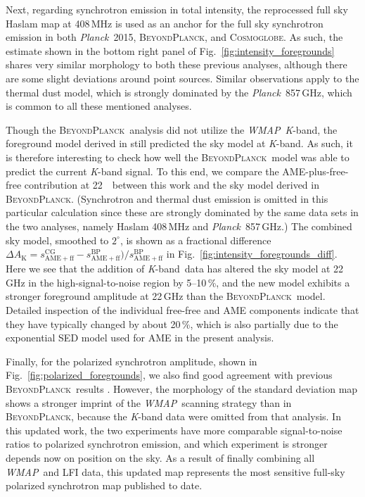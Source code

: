 \documentclass[twocolumn]{../../common/aa}
\def\WMAP{\emph{WMAP}}
\def\Planck{\emph{Planck}}
\newcommand{\BP}{\textsc{BeyondPlanck}}
\newcommand{\bp}{\textsc{BeyondPlanck}}
\newcommand{\cosmoglobe}{\textsc{Cosmoglobe}}
\newcommand{\K}[0]{\textit K}
\begin{document}
Next, regarding synchrotron emission in total intensity, the reprocessed full sky Haslam map \citep{remazeilles2014} at 408\,MHz is used as an anchor for the full sky synchrotron emission in both \Planck\ 2015, \bp, and \cosmoglobe. As such, the estimate shown in the bottom right panel of Fig.~\ref{fig:intensity_foregrounds} shares very similar morphology to both these previous analyses, although there are some slight deviations around point sources. Similar observations apply to the thermal dust model, which is strongly dominated by the \Planck\ 857\,GHz, which is common to all these mentioned analyses. 

Though the \BP\ analysis did not utilize the \WMAP\ \K-band, the foreground model derived in \cite{bp13} still predicted the sky model at \K-band. As such, it is therefore interesting to check how well the \BP\ model was able to predict the current \K-band signal. To this end, we compare the AME-plus-free-free contribution at 22~\GHz\ between this work and the sky model derived in \BP. (Synchrotron and thermal dust emission is omitted in this particular calculation since these are strongly dominated by the same data sets in the two analyses, namely Haslam 408\,MHz and \Planck\ 857\,GHz.) The combined sky model, smoothed to $2^\circ$, is shown as a fractional difference $\Delta A_{\mathrm{K}}=s^{\mathrm{CG}}_{\mathrm{AME}+\mathrm{ff}}-s^{\mathrm{BP}}_{\mathrm{AME}+\mathrm{ff}})/s^{\mathrm{BP}}_{\mathrm{AME}+\mathrm{ff}}$ in Fig.~\ref{fig:intensity_foregrounds_diff}. Here we see that the addition of \K-band\ data has altered the sky model at 22\,GHz in the high-signal-to-noise region by 5--10\,\%, and the new model exhibits a stronger foreground amplitude at 22\,GHz than the \bp\ model. Detailed inspection of the individual free-free and AME components indicate that they have typically changed by about 20\,\%, which is also partially due to the exponential SED model used for AME in the present analysis. 


Finally, for the polarized synchrotron amplitude, shown in Fig.~\ref{fig:polarized_foregrounds}, we also find good agreement with previous \bp\ results \citep{bp14}. However, the morphology of the standard deviation map shows a stronger imprint of the \WMAP\ scanning strategy than in \bp, because the \K-band data were omitted from that analysis. In this updated work, the two experiments have more comparable signal-to-noise ratios to polarized synchrotron emission, and which experiment is stronger depends now on position on the sky. As a result of finally combining all \WMAP\ and LFI data, this updated map represents the most sensitive full-sky polarized synchrotron map published to date.
\end{document}

